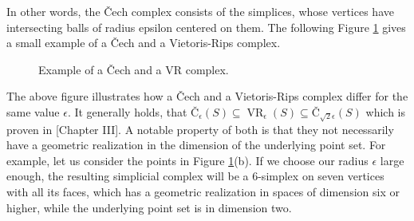 In other words, the \v{C}ech complex consists of the simplices, whose vertices have intersecting balls of radius epsilon centered on them. The following Figure \ref{fig:chech_vr_complex} gives a small example of a  \v{C}ech and a Vietoris-Rips complex.

\begin{figure}[H]
\begin{subfigure}[b]{0.49\textwidth}
\begin{center}

\end{center}
\end{subfigure}
\begin{subfigure}[b]{0.49\textwidth}
\begin{center}

\end{center}
\end{subfigure}
\begin{subfigure}[c]{0.49\textwidth}
\begin{center}

\end{center}
\end{subfigure}
\begin{subfigure}[c]{0.49\textwidth}
\begin{center}

\end{center}
\end{subfigure}
\caption{Example of a \v{C}ech and a VR complex.}
\label{fig:chech_vr_complex}
\end{figure}

The above figure illustrates how a \v{C}ech and a Vietoris-Rips complex differ for the same value $\epsilon$. It generally holds, that $\text{\v{C}}_\epsilon(S) \subseteq \operatorname{VR}_\epsilon(S) \subseteq \text{\v{C}}_{\sqrt{2}\epsilon}(S)$ which is proven in \cite{Computational+Topology}[Chapter III]. A notable property of both is that they not necessarily have a geometric realization in the dimension of the underlying point set. For example, let us consider the points in Figure \ref{fig:chech_vr_complex}(b). If we choose our radius $\epsilon$ large enough, the resulting simplicial complex will be a $6$-simplex on seven vertices with all its faces, which has a geometric realization in spaces of dimension six or higher, while the underlying point set is in dimension two. 


